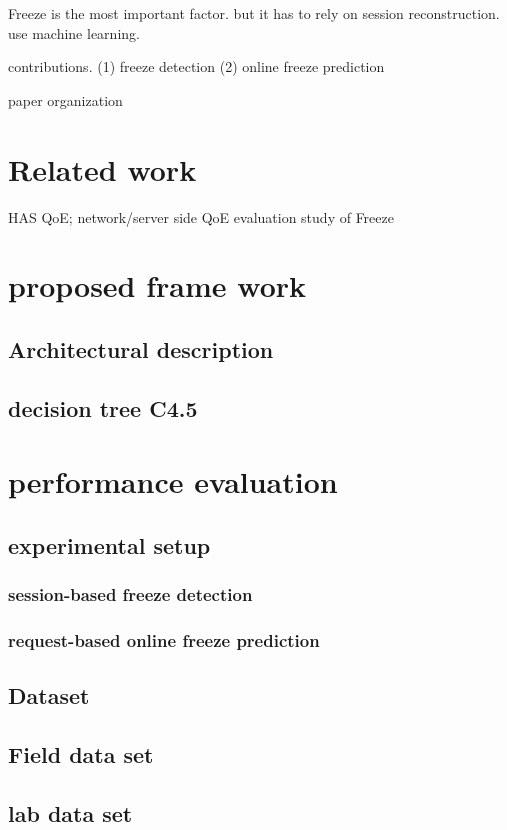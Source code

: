 \documentclass[journal]{IEEEtran}
\begin{document}
Freeze is the most important factor. but it has to rely on session reconstruction. use machine learning.

contributions. (1) freeze detection (2) online freeze prediction

paper organization

\section {Related work}
HAS QoE; 
network/server side QoE evaluation
study of Freeze 

\section{proposed frame work}
\subsection{Architectural description}
\subsection{decision tree C4.5}

\section{performance evaluation}

\subsection{experimental setup}
		\subsubsection{session-based freeze detection}
		\subsubsection{request-based online freeze prediction}

\subsection{Dataset}
\subsection{Field data set}
\subsection{lab data set}
\end{document}
